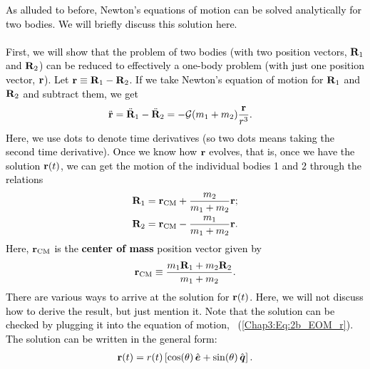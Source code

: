 \documentclass[main.tex]{subfiles}
\begin{document}
\begin{tcolorbox}[sharp corners, colback=blue!30, colframe=blue!80!blue, title=Box \refstepcounter{educhap3}\label{boxchap3:dynIII}\ref{boxchap3:dynIII} -- Orbital Dynamics III]
\par \textcolor{black}{As alluded to before, Newton's equations of motion can be solved analytically for two bodies. We will briefly discuss this solution here. \\ \\
First, we will show that the problem of two bodies (with two position vectors, ${\mathbf{R}}_1$ and ${\mathbf{R}}_2$) can be reduced to effectively a one-body problem (with just one position vector, ${\mathbf{r}}$). Let ${\mathbf{r}} \equiv {\mathbf{R}}_1 - {\mathbf{R}}_2$. If we take Newton's equation of motion for ${\mathbf{R}}_1$ and ${\mathbf{R}}_2$ and subtract them, we get
\begin{align}
\label{Chap3:Eq:2b_EOM_r}
\ddot{{\mathbf{r}}} &= \ddot{{\mathbf{R}}}_1 - \ddot{{\mathbf{R}}}_2 =  -\mathcal{G} (m_1+m_2)  \frac{{\mathbf{r}}}{r^3}.
\end{align}
Here, we use dots to denote time derivatives (so two dots means taking the second time derivative). Once we know how ${\mathbf{r}}$ evolves, that is, once we have the solution ${\mathbf{r}}(t)$, we can get the motion of the individual bodies 1 and 2 through the relations
\begin{subequations}
\label{Chap3:Eq:R_r_relations}
\begin{align}
{\mathbf{R}}_1 &= {\mathbf{r}}_\mathrm{CM} + \frac{m_2}{m_1+m_2} {\mathbf{r}}; \\
{\mathbf{R}}_2 &= {\mathbf{r}}_\mathrm{CM} - \frac{m_1}{m_1+m_2} {\mathbf{r}}.
\end{align}
\end{subequations}
Here, ${\mathbf{r}}_\mathrm{CM}$ is the {\bf center of mass} position vector given by
\begin{align}
\label{Chap3:Eq:r_CM_def}
{\mathbf{r}}_\mathrm{CM} \equiv \frac{m_1 {\mathbf{R}}_1 + m_2 {\mathbf{R}}_2}{m_1+m_2}.
\end{align} 
There are various ways to arrive at the solution for ${\mathbf{r}}(t)$. Here, we will not discuss how to derive the result, but just mention it. Note that the solution can be checked by plugging it into the equation of motion, \Eq~(\ref{Chap3:Eq:2b_EOM_r}). The solution can be written in the general form:
\begin{align}
\label{Chap3:Eq:r_sol}
{\mathbf{r}}(t) = r(t) \left [ \cos(\theta) \, \hat{\boldsymbol{e}} + \sin(\theta) \, \hat{\boldsymbol{q}} \right ].
\end{align}
}
\end{tcolorbox}
\end{document}

